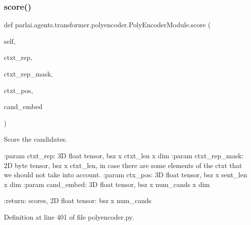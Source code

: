 \subsubsection{\texorpdfstring{score()}{score()}}
{\footnotesize\ttfamily def parlai.\+agents.\+transformer.\+polyencoder.\+Poly\+Encoder\+Module.\+score (\begin{DoxyParamCaption}\item[{}]{self,  }\item[{}]{ctxt\+\_\+rep,  }\item[{}]{ctxt\+\_\+rep\+\_\+mask,  }\item[{}]{ctxt\+\_\+pos,  }\item[{}]{cand\+\_\+embed }\end{DoxyParamCaption})}

\begin{DoxyVerb}Score the candidates.

:param ctxt_rep:
    3D float tensor, bsz x ctxt_len x dim
:param ctxt_rep_mask:
    2D byte tensor, bsz x ctxt_len, in case there are some elements
    of the ctxt that we should not take into account.
:param ctx_pos: 3D float tensor, bsz x sent_len x dim
:param cand_embed: 3D float tensor, bsz x num_cands x dim

:return: scores, 2D float tensor: bsz x num_cands
\end{DoxyVerb}
 

Definition at line 401 of file polyencoder.\+py.


